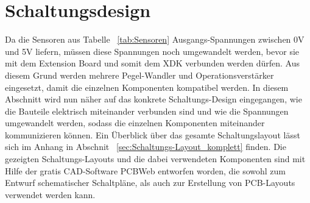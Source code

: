 \section{Schaltungsdesign}\label{sec:Schaltungsdesign}
Da die Sensoren aus Tabelle ~\ref{tab:Sensoren} Ausgangs-Spannungen zwischen 0V und 5V liefern, müssen diese Spannungen noch umgewandelt werden, bevor sie mit dem Extension Board und somit dem XDK verbunden werden dürfen. Aus diesem Grund werden mehrere Pegel-Wandler und Operationsverstärker eingesetzt, damit die einzelnen Komponenten kompatibel werden.
\newline
In diesem Abschnitt wird nun näher auf das konkrete Schaltungs-Design eingegangen, wie die Bauteile elektrisch miteinander verbunden sind und wie die Spannungen umgewandelt werden, sodass die einzelnen Komponenten miteinander kommunizieren können. Ein Überblick über das gesamte Schaltungslayout lässt sich im Anhang in Abschnit ~\ref{sec:Schaltungs-Layout_komplett} finden.
\newline
Die gezeigten Schaltungs-Layouts und die dabei verwendeten Komponenten sind mit Hilfe der gratis \acf{CAD}-Software PCBWeb entworfen worden, die sowohl zum Entwurf schematischer Schaltpläne, als auch zur Erstellung von \acf{PCB}-Layouts verwendet werden kann.
